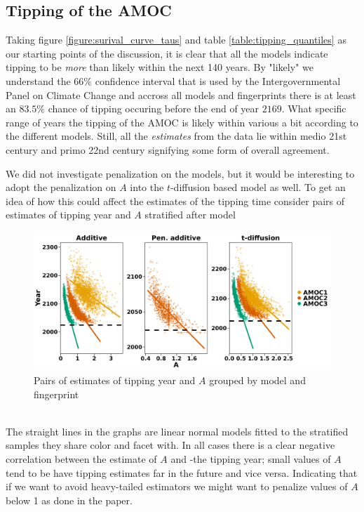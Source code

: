 \subsection{Tipping of the AMOC}
Taking figure \ref{figure:surival_curve_taus} and table \ref{table:tipping_quantiles} as our starting points of the discussion, it is clear that all the models indicate tipping to be \textit{more} than likely within the next 140 years. By "likely" we understand the 66\% confidence interval that is used by the Intergovernmental Panel on Climate Change \cite{Ditlevsen2023} and accross all models and fingerprints there is at least an $83.5\%$ chance of tipping occuring before the end of year $2169$. What specific range of years the tipping of the AMOC is likely within various a bit according to the different models. Still, all the \textit{estimates} from the data lie within medio 21st century and primo 22nd century signifying some form of overall agreement.

We did not investigate penalization on the models, but it would be interesting to adopt the penalization on $A$ into the $t$-diffusion based model as well. To get an idea of how this could affect the estimates of the tipping time consider pairs of estimates of tipping year and $A$ stratified after model
\begin{figure}[h!]
    \begin{center}
    \includegraphics[scale = .082]{figures/correlation_between_A_and_tau_plot.jpeg}
    \caption{Pairs of estimates of tipping year and $A$ grouped by model and fingerprint}
    \label{figure:correlation_A_and_tau}
\end{center}
\end{figure}\\
The straight lines in the graphs are linear normal models fitted to the stratified samples they share color and facet with. In all cases there is a clear negative correlation between the estimate of $A$ and -the tipping year; small values of $A$ tend to be have tipping estimates far in the future and vice versa. Indicating that if we want to avoid heavy-tailed estimators we might want to penalize values of $A$ below 1 as done in the paper.

